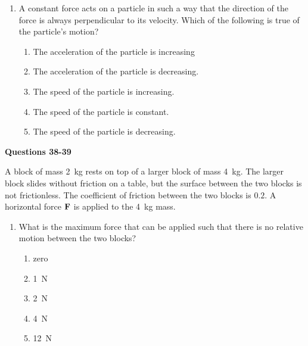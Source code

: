 \documentclass{../../oss-apphys}
\begin{document}
\begin{multicols}{2}
\begin{enumerate}[resume,leftmargin=18pt]
  \item A constant force acts on a particle in such a way that the direction of
    the force is always perpendicular to its velocity. Which of the
    following is true of the particle's motion?
    \begin{enumerate}[noitemsep,topsep=0pt,leftmargin=18pt,label=(\Alph*)]
    \item The acceleration of the particle is increasing
    \item The acceleration of the particle is decreasing.
    \item The speed of the particle is increasing.
    \item The speed of the particle is constant.
    \item The speed of the particle is decreasing.
    \end{enumerate}

  \end{enumerate}
  \columnbreak
  
  \textbf{Questions 38-39}

  A block of mass \SI{2}{\kilo\gram} rests on top of a larger block of mass
  \SI{4}{\kilo\gram}. The larger block slides without friction on a table, but
  the surface between the two blocks is not frictionless. The coefficient of
  friction between the two blocks is $0.2$. A horizontal force $\mathbf{F}$ is
  applied to the \SI{4}{\kilo\gram} mass.
  \begin{enumerate}[resume,leftmargin=18pt]
  \item What is the maximum force that can be applied such that there is no
    relative motion between the two blocks?
    \begin{enumerate}[noitemsep,topsep=0pt,leftmargin=18pt,label=(\Alph*)]
    \item zero
    \item \SI{1}{\newton}
    \item \SI{2}{\newton}
    \item \SI{4}{\newton}
    \item \SI{12}{\newton}
    \end{enumerate}


\end{enumerate}
\end{multicols}
\end{document}
